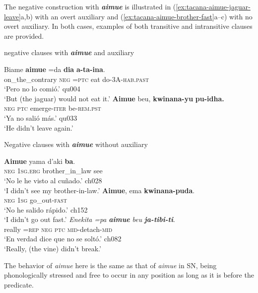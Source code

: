 \documentclass[output=paper]{langsci/langscibook}
\begin{document}
The negative construction with \textbf{\textit{aimue}} is illustrated in
(\ref{ex:tacana-aimue-jaguar-leave}a,b) with an overt auxiliary and
(\ref{ex:tacana-aimue-brother-fast}a--c) with no overt auxiliary. In both cases, examples of both transitive and intransitive clauses are provided.
%
\begin{exe}\ex
\label{ex:tacana-aimue-jaguar-leave}  negative clauses with \textbf{\textit{aimue}} and auxiliary
\begin{xlist}
\ex\label{ex:tacana-aimue-jaguar}
\gll  Biame  \textbf{aimue}  =da \textbf{dia}
\textbf{a-ta-ina}.\\
    on\_the\_contrary  \textsc{neg}  \textsc{=ptc}  eat
    do\textsc{-3A-hab.past}\\
\glt `Pero no lo comió.' qu004\\
`But (the jaguar) would not eat it.'
\ex\label{ex:tacana-aimue-leave}
\gll  \textbf{Aimue}  beu,
\textbf{kwinana-yu}
\textbf{pu-idha.}\\
    \textsc{neg}  \textsc{ptc}  emerge-\textsc{iter}  be\textsc{-rem.pst}\\
\glt `Ya no salió más.' qu033\\
`He didn't leave again.'
\end{xlist}
\ex
\label{ex:tacana-aimue-brother-fast}  Negative clauses with \textbf{\textit{aimue}} without auxiliary
\begin{xlist}
\ex\label{ex:tacana-aimue-brother}
\gll  \textbf{Aimue}  yama
d'aki
\textbf{ba}.\\
    \textsc{neg}  \textsc{1sg.erg}  brother\_in\_law  see\\
\glt `No le he visto al cuñado.' ch028\\
`I didn't see my brother-in-law.'
\ex\label{ex:tacana-aimue-fast}
\gll  \textbf{Aimue},  ema
\textbf{kwinana-puda}.\\
    \textsc{neg}  \textsc{1sg}  go\_out-\textsc{fast}\\
\glt `No he salido rápido.' ch152\\
`I didn't go out fast.'
\ex\label{ex:tacana-aimue-liana}
\gll  \textit{Enekita}  \textit{=pa}  \textbf{\textit{aimue}}
\textit{beu}
\textbf{\textit{ja-tibi-ti}}.\\
really  =\textsc{rep}  \textsc{neg}  \textsc{ptc}
\textsc{mid-}detach-\textsc{mid}\\
\glt `En verdad dice que no se soltó.' ch082\\
`Really, (the vine) didn't break.'
\end{xlist}\end{exe}
%
The behavior of \textit{aimue} here is the same as that of \textit{aimue} in SN, being phonologically stressed and free to occur in any position as long as it is before the predicate.
\end{document}
